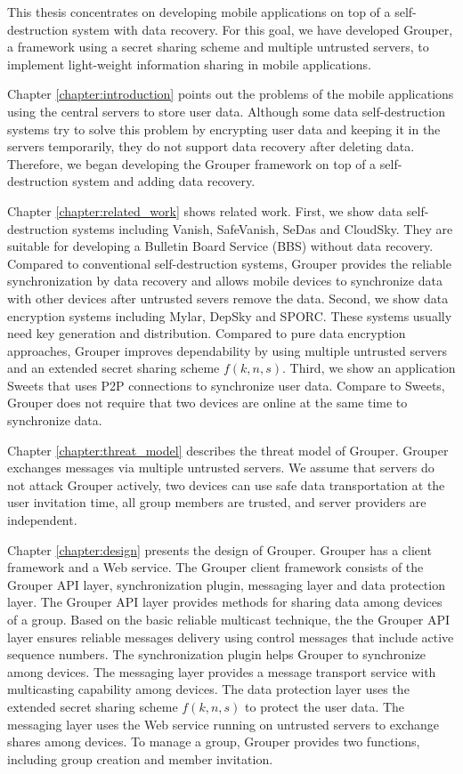 \documentclass[a4paper,11pt]{report}
\begin{document}
This thesis concentrates on developing mobile applications on top of a self-destruction system with data recovery.
For this goal, we have developed Grouper, a framework using a secret sharing scheme and multiple untrusted servers, to implement light-weight information sharing in mobile applications.

Chapter \ref{chapter:introduction} points out the problems of the mobile applications using the central servers to store user data.
Although some data self-destruction systems try to solve this problem by encrypting user data and keeping it in the servers temporarily, they do not support data recovery after deleting data.
Therefore, we began developing the Grouper framework on top of a self-destruction system and adding data recovery.

Chapter \ref{chapter:related_work} shows related work.
First, we show data self-destruction systems including Vanish, SafeVanish, SeDas and CloudSky.
They are suitable for developing a Bulletin Board Service (BBS) without data recovery.
Compared to conventional self-destruction systems, Grouper provides the reliable synchronization by data recovery and allows mobile devices to synchronize data with other devices after untrusted severs remove the data.
Second, we show data encryption systems including Mylar, DepSky and SPORC.
These systems usually need key generation and distribution.
Compared to pure data encryption approaches, Grouper improves dependability by using multiple untrusted servers and an extended secret sharing scheme $f(k, n, s)$.
Third, we show an application Sweets that uses P2P connections to synchronize user data.
Compare to Sweets, Grouper does not require that two devices are online at the same time to synchronize data.

Chapter \ref{chapter:threat_model} describes the threat model of Grouper.
Grouper exchanges messages via multiple untrusted servers.
We assume that servers do not attack Grouper actively, two devices can use safe data transportation at the user invitation time, all group members are trusted, and server providers are independent.  

Chapter \ref{chapter:design} presents the design of Grouper.
Grouper has a client framework and a Web service.
The Grouper client framework consists of the Grouper API layer, synchronization plugin, messaging layer and data protection layer.
The Grouper API layer provides methods for sharing data among devices of a group.
Based on the basic reliable multicast technique, the the Grouper API layer ensures reliable messages delivery using control messages that include active sequence numbers.
The synchronization plugin helps Grouper to synchronize among devices.
The messaging layer provides a message transport service with multicasting capability among devices.
The data protection layer uses the extended secret sharing scheme $f(k ,n, s)$ to protect the user data.
The messaging layer uses the Web service running on untrusted servers to exchange shares among devices. 
To manage a group, Grouper provides two functions, including group creation and member invitation.
\end{document}
